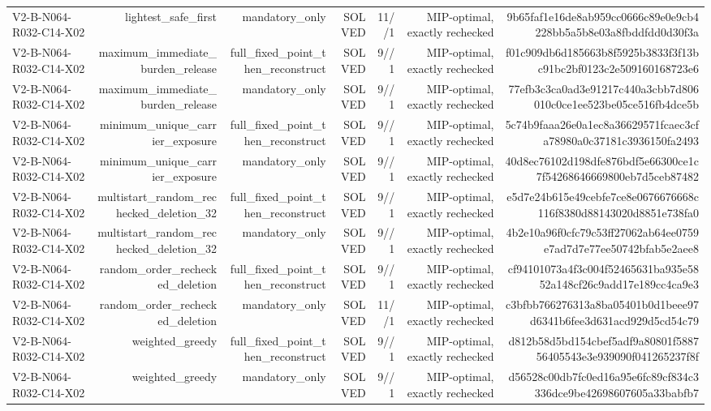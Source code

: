 {\begin{longtable}{lrrrrrr}
V2-B-N064-R032-C14-X02 & lightest\_safe\_first & mandatory\_only & SOLVED & 11//1 & MIP-optimal, exactly rechecked & 9b65faf1e16de8ab959cc0666c89e0e9cb4228bb5a5b8e03a8fbddfdd0d30f3a \\
V2-B-N064-R032-C14-X02 & maximum\_immediate\_burden\_release & full\_fixed\_point\_then\_reconstruct & SOLVED & 9//1 & MIP-optimal, exactly rechecked & f01c909db6d185663b8f5925b3833f3f13bc91bc2bf0123c2e509160168723e6 \\
V2-B-N064-R032-C14-X02 & maximum\_immediate\_burden\_release & mandatory\_only & SOLVED & 9//1 & MIP-optimal, exactly rechecked & 77efb3c3ca0ad3e91217c440a3cbb7d806010c0ce1ee523be05ce516fb4dce5b \\
V2-B-N064-R032-C14-X02 & minimum\_unique\_carrier\_exposure & full\_fixed\_point\_then\_reconstruct & SOLVED & 9//1 & MIP-optimal, exactly rechecked & 5c74b9faaa26e0a1ec8a36629571fcaec3cfa78980a0c37181c3936150fa2493 \\
V2-B-N064-R032-C14-X02 & minimum\_unique\_carrier\_exposure & mandatory\_only & SOLVED & 9//1 & MIP-optimal, exactly rechecked & 40d8ec76102d198dfe876bdf5e66300ce1c7f54268646669800eb7d5ceb87482 \\
V2-B-N064-R032-C14-X02 & multistart\_random\_rechecked\_deletion\_32 & full\_fixed\_point\_then\_reconstruct & SOLVED & 9//1 & MIP-optimal, exactly rechecked & e5d7e24b615e49cebfe7ce8e0676676668c116f8380d88143020d8851e738fa0 \\
V2-B-N064-R032-C14-X02 & multistart\_random\_rechecked\_deletion\_32 & mandatory\_only & SOLVED & 9//1 & MIP-optimal, exactly rechecked & 4b2e10a96f0cfc79c53ff27062ab64ee0759e7ad7d7e77ee50742bfab5e2aee8 \\
V2-B-N064-R032-C14-X02 & random\_order\_rechecked\_deletion & full\_fixed\_point\_then\_reconstruct & SOLVED & 9//1 & MIP-optimal, exactly rechecked & cf94101073a4f3c004f52465631ba935e5852a148cf26c9add17e189cc4ca9e3 \\
V2-B-N064-R032-C14-X02 & random\_order\_rechecked\_deletion & mandatory\_only & SOLVED & 11//1 & MIP-optimal, exactly rechecked & c3bfbb766276313a8ba05401b0d1beee97d6341b6fee3d631acd929d5cd54c79 \\
V2-B-N064-R032-C14-X02 & weighted\_greedy & full\_fixed\_point\_then\_reconstruct & SOLVED & 9//1 & MIP-optimal, exactly rechecked & d812b58d5bd154cbef5adf9a80801f588756405543e3e939090f041265237f8f \\
V2-B-N064-R032-C14-X02 & weighted\_greedy & mandatory\_only & SOLVED & 9//1 & MIP-optimal, exactly rechecked & d56528c00db7fc0ed16a95e6fc89cf834c3336dce9be42698607605a33babfb7 \\

\end{longtable}}
